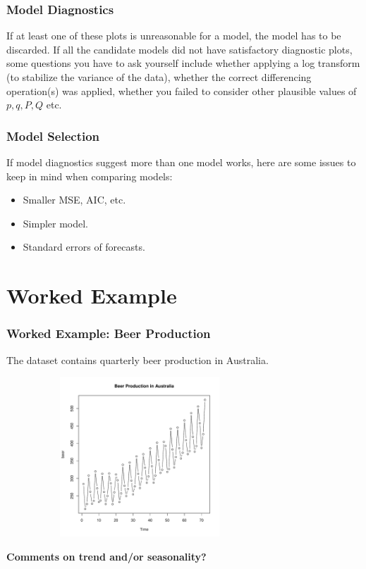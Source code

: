\documentclass[%
xcolor=pdftex]{beamer}
\begin{document}
\begin{frame}
\frametitle{Model Diagnostics}

If at least one of these plots is unreasonable for a model, the model has to be discarded. If all the candidate models did not have satisfactory diagnostic plots, some questions you have to ask yourself include whether applying a log transform (to stabilize the variance of the data), whether the correct differencing operation(s) was applied, whether you failed to consider other plausible values of $p, q, P, Q$ etc.

\end{frame}

\begin{frame}
\frametitle{Model Selection}

If model diagnostics suggest more than one model works, here are some issues to keep in mind when comparing models:

\begin{itemize}
\item Smaller MSE, AIC, etc.
\item Simpler model.
\item Standard errors of forecasts.
\end{itemize}


\end{frame}

\section{Worked Example}
\frame{\tableofcontents[currentsection]}

\begin{frame}
\frametitle{Worked Example: Beer Production}

The dataset contains quarterly beer production in Australia.

\includegraphics[width=100mm, height=60mm]{beer_ts.pdf}

\textbf{Comments on trend and/or seasonality?}

\end{frame}
\end{document}
